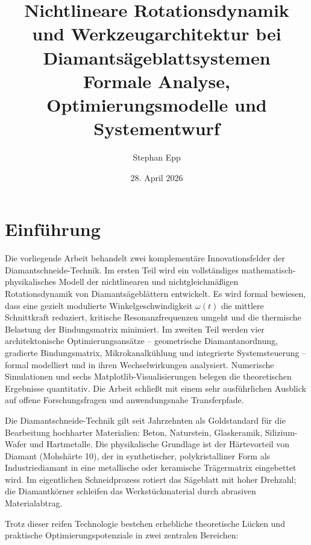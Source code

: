 ﻿\documentclass[a4paper,12pt]{article}
\title{\textbf{Nichtlineare Rotationsdynamik und Werkzeugarchitektur bei Diamants{\"a}geblattsystemen}\\[0.1em]
\large Formale Analyse, Optimierungsmodelle und Systementwurf}
\author{Stephan Epp}
\date{28. April 2026}
\theoremstyle{definition}
\begin{document}
\maketitle
\tableofcontents
\newpage

\section{Einführung}
Die vorliegende Arbeit behandelt zwei komplementäre Innovationsfelder der Diamantschnei\-de-Technik.
Im ersten Teil wird ein vollständiges mathematisch-physikalisches Modell der nichtlinearen und
nichtgleichmäßigen Rotationsdynamik von Diamantsägeblättern entwickelt. Es wird formal
bewiesen, dass eine gezielt modulierte Winkelgeschwindigkeit $\omega(t)$ die mittlere Schnittkraft
reduziert, kritische Resonanzfrequenzen umgeht und die thermische Belastung der Bindungsmatrix
minimiert. Im zweiten Teil werden vier architektonische Optimierungsansätze -- geometrische
Diamantanordnung, gradierte Bindungsmatrix, Mikrokanalkühlung und integrierte Systemsteuerung --
formal modelliert und in ihren Wechselwirkungen analysiert. Numerische Simulationen und sechs
Matplotlib-Visualisierungen belegen die theoretischen Ergebnisse quantitativ.
Die Arbeit schließt mit einem sehr ausführlichen Ausblick auf offene Forschungsfragen und
anwendungsnahe Transferpfade.

Die Diamantschneide-Technik gilt seit Jahrzehnten als Goldstandard für die Bearbeitung
hochharter Materialien: Beton, Naturstein, Glaskeramik, Silizium-Wafer und Hartmetalle.
Die physikalische Grundlage ist der Härtevorteil von Diamant (Mohshärte 10), der in synthetischer, 
polykristalliner Form als Industriediamant in eine metallische
oder keramische Trägermatrix eingebettet wird. Im eigentlichen Schneidprozess rotiert
das Sägeblatt mit hoher Drehzahl; die Diamantkörner schleifen das Werkstückmaterial
durch abrasiven Materialabtrag.

Trotz dieser reifen Technologie bestehen erhebliche theoretische Lücken und praktische
Optimierungspotenziale in zwei zentralen Bereichen:
\end{document}
